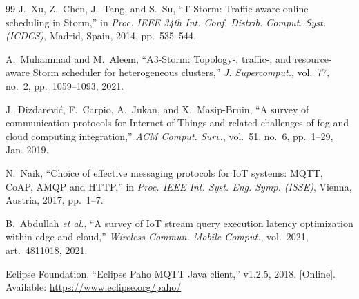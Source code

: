 \documentclass[conference]{IEEEtran}
\begin{document}
\begin{thebibliography}{99}
J.~Xu, Z.~Chen, J.~Tang, and S.~Su,
``T-Storm: Traffic-aware online scheduling in Storm,''
in \emph{Proc. IEEE 34th Int. Conf. Distrib. Comput. Syst. (ICDCS)},
Madrid, Spain, 2014, pp.~535--544.

A.~Muhammad and M.~Aleem,
``A3-Storm: Topology-, traffic-, and resource-aware Storm scheduler for
heterogeneous clusters,''
\emph{J. Supercomput.}, vol.~77, no.~2, pp.~1059--1093, 2021.

J.~Dizdarevi\'c, F.~Carpio, A.~Jukan, and X.~Masip-Bruin,
``A survey of communication protocols for Internet of Things and related
challenges of fog and cloud computing integration,''
\emph{ACM Comput. Surv.}, vol.~51, no.~6, pp.~1--29, Jan. 2019.

N.~Naik,
``Choice of effective messaging protocols for IoT systems: MQTT, CoAP, AMQP and
HTTP,''
in \emph{Proc. IEEE Int. Syst. Eng. Symp. (ISSE)}, Vienna, Austria,
2017, pp.~1--7.

B.~Abdullah \emph{et al.},
``A survey of IoT stream query execution latency optimization within edge and
cloud,''
\emph{Wireless Commun. Mobile Comput.}, vol.~2021, art.~4811018, 2021.

Eclipse Foundation,
``Eclipse Paho MQTT Java client,'' v1.2.5, 2018. [Online]. Available:
\url{https://www.eclipse.org/paho/}

\end{thebibliography}
\end{document}
